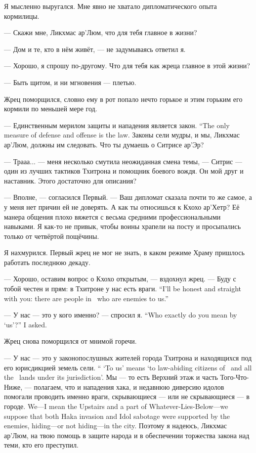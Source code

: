 Я мысленно выругался.
Мне явно не хватало дипломатического опыта кормилицы.

--- Скажи мне, Ликхмас ар'Люм, что для тебя главное в жизни?

--- Дом и те, кто в нём живёт, --- не задумываясь ответил я.

--- Хорошо, я спрошу по-другому.
Что для тебя как жреца главное в этой жизни?

--- Быть щитом, и ни мгновения --- плетью.

Жрец поморщился, словно ему в рот попало нечто горькое и этим горьким его кормили по меньшей мере год.

{--- Единственным мерилом защиты и нападения является закон.}
{``The only measure of defense and offense is the law.}
Законы сели мудры, и мы, Ликхмас ар'Люм, должны им следовать.
Что ты думаешь о Ситрисе ар'Эр?

--- Трааа... --- меня несколько смутила неожиданная смена темы, --- Ситрис --- один из лучших тактиков Тхитрона и помощник боевого вождя.
Он мой друг и наставник.
Этого достаточно для описания?

--- Вполне, --- согласился Первый.
--- Ваш дипломат сказала почти то же самое, а у меня нет причин ей не доверять.
А как ты относишься к Кхохо ар'Хетр?
Её манера общения плохо вяжется с весьма средними профессиональными навыками.
Я как-то не привык, чтобы воины храпели на посту и просыпались только от четвёртой пощёчины.

Я нахмурился.
Первый жрец не мог не знать, в каком режиме Храму пришлось работать последнюю декаду.

--- Хорошо, оставим вопрос о Кхохо открытым, --- вздохнул жрец.
{--- Буду с тобой честен и прям: в Тхитроне у нас есть враги.}
{``I'll be honest and straight with you: there are people in \Tchitron\ who are enemies to us.''}

{--- У нас --- это у кого именно? --- спросил я.}
{``Who exactly do you mean by `us'?'' I asked.}

Жрец снова поморщился от мнимой горечи.

{--- У нас --- это у законопослушных жителей города Тхитрона и находящихся под его юрисдикцией земель сели.}
{`` `To us' means `to law-abiding citizens of \Tchitron\ and all the \Seli\ lands under its jurisdiction'.}
{Мы --- то есть Верхний этаж и часть Того-Что-Ниже, --- полагаем, что и нападения хака, и недавнюю диверсию идолов помогали проводить именно враги, скрывающиеся --- или не скрывающиеся --- в городе.}
{We---I mean the Upstairs and a part of Whatever-Lies-Below---we suppose that both Haka invasion and Idol sabotage were supported by the enemies, hiding---or not hiding---in the city.}
Поэтому я надеюсь, Ликхмас ар'Люм, на твою помощь в защите народа и в обеспечении торжества закона над теми, кто его преступил.

